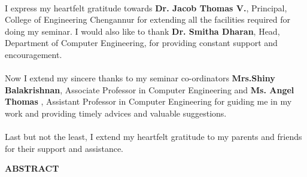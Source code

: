 \documentclass[a4paper,12pt,oneside]{article}
\begin{document}
\paragraph{}
I express my heartfelt gratitude towards \textbf{Dr. Jacob Thomas V.}, Principal, College
of Engineering Chengannur for extending all the facilities required for doing my seminar.
I would also like to thank \textbf{Dr. Smitha Dharan}, Head, Department of Computer
Engineering, for providing constant support and encouragement.
\paragraph{}
Now I extend my sincere thanks to my seminar co-ordinators \textbf{Mrs.Shiny Balakrishnan}, Associate
Professor in Computer Engineering and \textbf{Ms. Angel Thomas} , Assistant
Professor in Computer Engineering for guiding me in my work and providing timely
advices and valuable suggestions.
\paragraph{}
Last but not the least, I extend my heartfelt gratitude to my parents and friends for
their support and assistance.	

\newpage

\begin{center}
\large{\textbf{ABSTRACT}}
\end{center}
\vspace{6ex}
\paragraph{}
\end{document}
